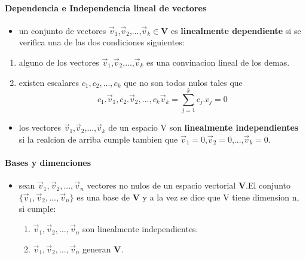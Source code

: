 \documentclass[a4paper]{article}
\begin{document}
\paragraph{Dependencia e Independencia lineal de vectores}
\begin{itemize}
	\item un conjunto de vectores $\vec{v}_1$,$\vec{v}_2$,...,$\vec{v}_k \in \textbf{V}$ es \textbf{linealmente dependiente} si se verifica una de las dos condiciones siguientes:
\end{itemize}
\begin{enumerate}
	\item alguno de los vectores $\vec{v}_1$,$\vec{v}_2$,...,$\vec{v}_k$ es una convinacion lineal de los demas.
	\item existen escalares $c_1,c_2,...,c_k$ que no son todos nulos tales que 
	\begin{equation}
		 c_1.\vec{v}_1,c_2.\vec{v}_2,...,c_k\vec{v}_k = \sum_{j=1}^{k} c_j.v_j = 0
	\end{equation}
\end{enumerate}
\begin{itemize}
	\item los vectores $\vec{v}_1$,$\vec{v}_2$,...,$\vec{v}_k$  de un espacio V son \textbf{linealmente independientes} si la realcion de arriba cumple tambien que $\vec{v}_1 = 0$,$\vec{v}_2 = 0$,...,$\vec{v}_k = 0$. 
	\end{itemize}
	
\paragraph{Bases y dimenciones}
\begin{itemize}
	\item sean $\vec{v}_1,\vec{v}_2,...,\vec{v}_n$ vectores no nulos de un espacio vectorial \textbf{V}.El conjunto $\lbrace\vec{v}_1,\vec{v}_2,...,\vec{v}_n\rbrace$ es una base de \textbf{V} y a la vez se dice que V tiene dimension n, si cumple:
\begin{enumerate}
	\item $\vec{v}_1,\vec{v}_2,...,\vec{v}_n$ son linealmente independientes.
	\item $\vec{v}_1,\vec{v}_2,...,\vec{v}_n$ generan $\textbf{V}$.
\end{enumerate}	
\end{itemize}
\end{document}
